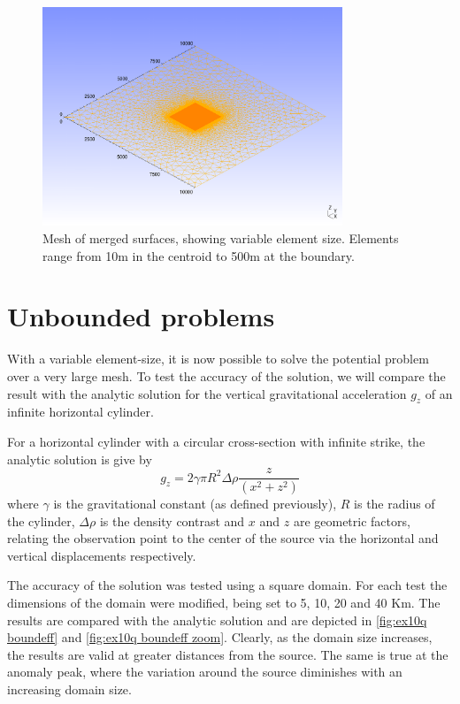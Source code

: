 \begin{figure}[ht]
\centering
\includegraphics[width=0.8\textwidth]{figures/ex10m_msh.png}
\caption{Mesh of merged surfaces, showing variable element size. Elements
range from 10m in the centroid to 500m at the boundary.}
\label{fig:ex10mmsh}
\end{figure}
\clearpage

\section{Unbounded problems}
With a variable element-size, it is now possible to solve the potential problem
over a very large mesh. To test the accuracy of the solution, we will compare
the \esc result with the analytic solution for the vertical gravitational
acceleration $g_z$ of an infinite horizontal cylinder.

For a horizontal cylinder with a circular cross-section with infinite strike,
the analytic solution is give by
\begin{equation}
g_z = 2\gamma\pi R^2 \Delta\rho \frac{z}{(x^2+z^2)} 
\end{equation}
where $\gamma$ is the gravitational constant (as defined previously), $R$ is the
radius of the cylinder, $\Delta\rho$ is the density contrast and $x$ and $z$ are
geometric factors, relating the observation point to the center of the source
via the horizontal and vertical displacements respectively.

The accuracy of the solution was tested using a square domain. For each test the
dimensions of the domain were modified, being set to 5, 10, 20 and 40 Km. The
results are compared with the analytic solution and are depicted in
\autoref{fig:ex10q boundeff} and \autoref{fig:ex10q boundeff zoom}. Clearly, 
as the domain size increases, the results are valid at greater
distances from the source. The same is true at the anomaly peak, where the
variation around the source diminishes with an increasing domain size.

